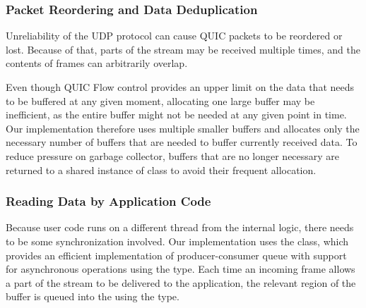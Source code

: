 

\subsubsection{Packet Reordering and Data Deduplication}

Unreliability of the UDP protocol can cause QUIC packets to be reordered or lost. Because of that,
parts of the stream may be received multiple times, and the contents of \STREAM{} frames can
arbitrarily overlap.

Even though QUIC Flow control provides an upper limit on the data that needs to be buffered at any
given moment, allocating one large buffer may be inefficient, as the entire buffer might not be
needed at any given point in time. Our implementation therefore uses multiple smaller buffers and
allocates only the necessary number of buffers that are needed to buffer currently received data. To
reduce pressure on garbage collector, buffers that are no longer necessary are returned to a shared
instance of  class to avoid their frequent allocation.

\subsubsection{Reading Data by Application Code}

Because user code runs on a different thread from the internal \QuicConnection{} logic, there needs
to be some synchronization involved. Our implementation uses the  class, which
provides an efficient implementation of producer-consumer queue with support for asynchronous
operations using the  type. Each time an incoming \STREAM{} frame allows a part
of the stream to be delivered to the application, the relevant region of the buffer is queued into
the  using the  type.




